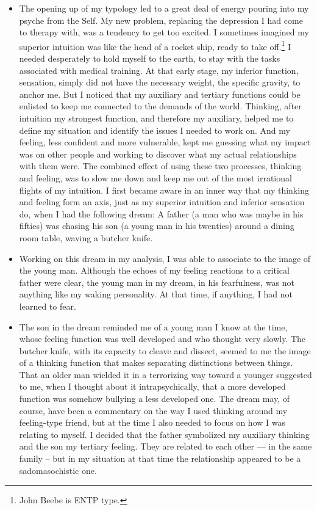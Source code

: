 \begin{itemize}
\item The opening up of my typology led to a great deal of energy pouring into
my psyche from the Self. My new problem, replacing the depression I had come to
therapy with, was a tendency to get too excited. I sometimes imagined my
superior intuition was like the head of a rocket ship, ready to take
off.\footnote{John Beebe is ENTP type.} I needed desperately to hold myself to
the earth, to stay with the tasks associated with medical training. At that
early stage, my inferior function, sensation, simply did not have the necessary
weight, the specific gravity, to anchor me. But I noticed that my auxiliary and
tertiary functions could be enlisted to keep me connected to the demands of the
world. Thinking, after intuition my strongest function, and therefore my
auxiliary, helped me to define my situation and identify the issues I needed to
work on.  And my feeling, less confident and more vulnerable, kept me guessing
what my impact was on other people and working to discover what my actual
relationships with them were. The combined effect of using these two processes,
thinking and feeling, was to slow me down and keep me out of the most
irrational flights of my intuition. I first became aware in an inner way that
my thinking and feeling form an axis, just as my superior intuition and
inferior sensation do, when I had the following dream: A father (a man who was
maybe in his fifties) was chasing his son (a young man in his twenties) around
a dining room table, waving a butcher knife.

\item Working on this dream in my analysis, I was able to associate to the
image of the young man. Although the echoes of my feeling reactions to a
critical father were clear, the young man in my dream, in his fearfulness, was
not anything like my waking personality. At that time, if anything, I had not
learned to fear.

\item The son in the dream reminded me of a young man I know at the time, whose
feeling function was well developed and who thought very slowly. The butcher
knife, with its capacity to cleave and dissect, seemed to me the image of a
thinking function that makes separating distinctions between things.  That an
older man wielded it in a terrorizing way toward a younger suggested to me,
when I thought about it intrapsychically, that a more developed function was
somehow bullying a less developed one. The dream may, of course, have been a
commentary on the way I used thinking around my feeling-type friend, but at the
time I also needed to focus on how I was relating to myself. I decided that the
father symbolized my auxiliary thinking and the son my tertiary feeling.  They
are related to each other --- in the same family -- but in my situation at that
time the relationship appeared to be a sadomasochistic one.


\end{itemize}
